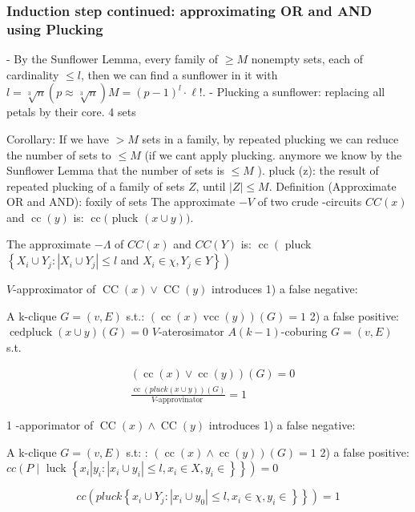 \subsubsection{Induction step continued: approximating OR and AND using Plucking}
- By the Sunflower Lemma, every family of $\geq M$ nonempty sets, each of cardinality $\leqslant l$, then we can find a sunflower in it with $l=\sqrt[3]{n}(p \approx \sqrt[3]{n}) M=(p-1)^l \cdot \ell!$.
- Plucking a sunflower: replacing all petals by their core. 4 sets

Corollary: If we have $>M$ sets in a family, by repeated plucking we can reduce the number of sets to $\leq M$ (if we cant apply plucking. anymore we know by the Sunflower Lemma that the number of sets is $\leqslant M$ ).
pluck (z): the result of repeated plucking of a family of sets $Z$, until $|Z| \leqslant M$.
Definition (Approximate OR and AND): foxily of sets The approximate $-V$ of two crude -circuits $C C(x)$ and $\operatorname{cc}(y)$ is: $\operatorname{cc}($ pluck $(x \cup y))$.

The approximate $-\Lambda$ of $C C(x)$ and $C C(Y)$ is: $\operatorname{cc}\left(\right.$ pluck $\left\{X_i \cup Y_j:\left|X_i \cup Y_j\right| \leqslant l\right.$ and $\left.\left.X_i \in \chi, Y_j \in Y\right\}\right)$





$V$-approximator of $\operatorname{CC}(x) \vee \operatorname{CC}(y)$ introduces
1) a false negative:

A k-clique $G=(v, E)$ s.t.: $(\operatorname{cc}(x) \operatorname{vcc}(y))(G)=1$
2) a false positive:
$\operatorname{cedpluck}(x \cup y)(G)=0$
$V$-aterosimator
$A(k-1)$-coburing $G=(v, E)$ s.t.

$$
\begin{aligned}
& (\operatorname{cc}(x) \vee \operatorname{cc}(y))(G)=0 \\
& \frac{\operatorname{cc}(p l u c k(x \cup y))(G)}{V \text {-approvinator }}=1
\end{aligned}
$$


1 -apporimator of $\operatorname{CC}(x) \wedge \operatorname{CC}(y)$ introduces
1) a false negative:

A k-clique $G=(v, E)$ s.t: : $(\operatorname{cc}(x) \wedge \operatorname{cc}(y))(G)=1$
2) a false positive: $c c\left(P \mid\right.$ luck $\left.\left\{x_i\left|y_i:\left|x_i \cup y_i\right| \leq l, x_i \in X, y_i \in\right\}\right\}\right)=0$

$$
\left.c c\left(p l u c k\left\{x_i \cup Y_j:\left|x_i \cup y_0\right| \leq l, x_i \in \chi, y_i \in\right\}\right\}\right)=1
$$




